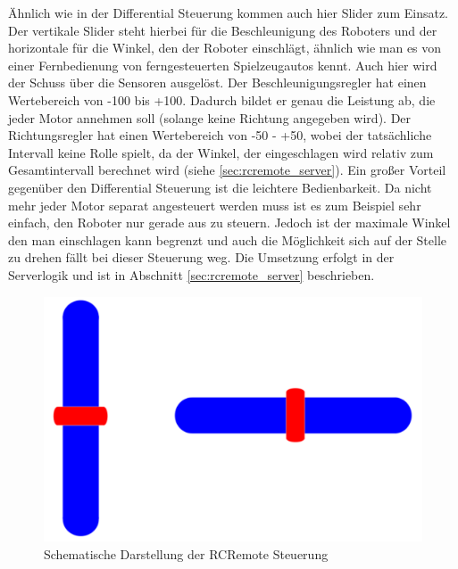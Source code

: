 Ähnlich wie in der Differential Steuerung kommen auch hier Slider zum Einsatz. Der vertikale Slider steht hierbei für die Beschleunigung des Roboters und der horizontale für die Winkel, den der Roboter einschlägt, ähnlich wie man es von einer Fernbedienung von ferngesteuerten Spielzeugautos kennt. Auch hier wird der Schuss über die Sensoren ausgelöst. Der Beschleunigungsregler hat einen Wertebereich von -100 bis +100. Dadurch bildet er genau die Leistung ab, die jeder Motor annehmen soll (solange keine Richtung angegeben wird). Der Richtungsregler hat einen Wertebereich von -50 - +50, wobei der tatsächliche Intervall keine Rolle spielt, da der Winkel, der eingeschlagen wird relativ zum Gesamtintervall berechnet wird (siehe \ref{sec:rcremote_server}). Ein großer Vorteil gegenüber den Differential Steuerung ist die leichtere Bedienbarkeit. Da nicht mehr jeder Motor separat angesteuert werden muss ist es zum Beispiel sehr einfach, den Roboter nur gerade aus zu steuern. Jedoch ist der maximale Winkel den man einschlagen kann begrenzt und auch die Möglichkeit sich auf der Stelle zu drehen fällt bei dieser Steuerung weg. Die Umsetzung erfolgt in der Serverlogik und ist in Abschnitt \ref{sec:rcremote_server} beschrieben.


\begin{figure}[h!]
	\centering
	\includegraphics[height=.25\textheight]{images/android_rcremote.pdf}
	\caption{Schematische Darstellung der RCRemote Steuerung}
	\label{fig:android_rcremote}
\end{figure}



